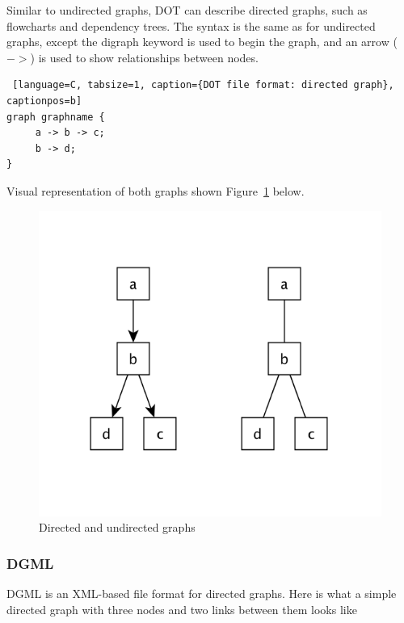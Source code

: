 Similar to undirected graphs, DOT can describe directed graphs, such as flowcharts and dependency trees.
The syntax is the same as for undirected graphs, except the digraph keyword is used to begin the graph, and an arrow ($->$) is used to show relationships between nodes.~\cite{DOT}

\begin{center}
\renewcommand{\thelstlisting}{\thesection.\arabic{lstlisting}}
\begin{lstlisting} [language=C, tabsize=1, caption={DOT file format: directed graph}, captionpos=b]
graph graphname {
     a -> b -> c;
     b -> d;
}
\end{lstlisting}
\end{center}

Visual representation of both graphs shown Figure~\ref{fig:dot_graphs} below.

\begin{figure}[h!]
\centering
\includegraphics[scale=0.3]{pictures/dot_graph.png}
\caption{Directed and undirected graphs}
\label{fig:dot_graphs}
\end{figure}

\subsubsection{DGML}
DGML is an XML-based file format for directed graphs. Here is what a simple directed graph with three nodes and two links between them looks like

